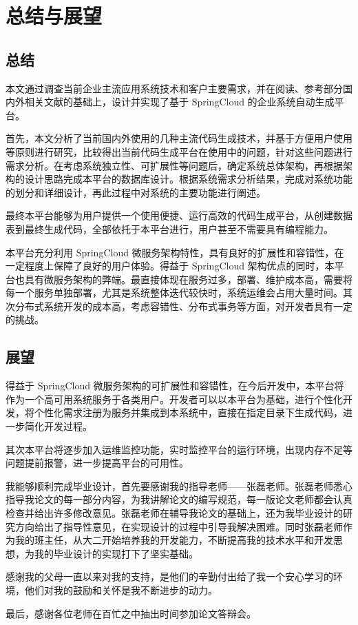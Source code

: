 \documentclass{izdthesis}
\begin{document}
\chapter{总结与展望}

\section{总结}
本文通过调查当前企业主流应用系统技术和客户主要需求，并在阅读、参考部分国内外相关文献的基础上，设计并实现了基于 SpringCloud 的企业系统自动生成平台。

首先，本文分析了当前国内外使用的几种主流代码生成技术，并基于方便用户使用等原则进行研究，比较得出当前代码生成平台在使用中的问题，针对这些问题进行需求分析。在考虑系统独立性、可扩展性等问题后，确定系统总体架构，再根据架构的设计思路完成本平台的数据库设计。根据系统需求分析结果，完成对系统功能的划分和详细设计，再此过程中对系统的主要功能进行阐述。

最终本平台能够为用户提供一个使用便捷、运行高效的代码生成平台，从创建数据表到最终生成代码，全部依托于本平台进行，用户甚至不需要具有编程能力。

本平台充分利用 SpringCloud 微服务架构特性，具有良好的扩展性和容错性，在一定程度上保障了良好的用户体验。得益于 SpringCloud 架构优点的同时，本平台也具有微服务架构的弊端。最直接体现在服务过多，部署、维护成本高，需要将每一个服务单独部署，尤其是系统整体迭代较快时，系统运维会占用大量时间。其次分布式系统开发的成本高，考虑容错性、分布式事务等方面，对开发者具有一定的挑战。

\section{展望}
得益于 SpringCloud 微服务架构的可扩展性和容错性，在今后开发中，本平台将作为一个高可用系统服务于各类用户。开发者可以以本平台为基础，进行个性化开发，将个性化需求注册为服务并集成到本系统中，直接在指定目录下生成代码，进一步简化开发过程。

其次本平台将逐步加入运维监控功能，实时监控平台的运行环境，出现内存不足等问题提前报警，进一步提高平台的可用性。


\begin{acknowledgements}
我能够顺利完成毕业设计，首先要感谢我的指导老师——张磊老师。张磊老师悉心指导我论文的每一部分内容，为我讲解论文的编写规范，每一版论文老师都会认真检查并给出许多修改意见。张磊老师在辅导我论文的基础上，还为我毕业设计的研究方向给出了指导性意见，在实现设计的过程中引导我解决困难。同时张磊老师作为我的班主任，从大二开始培养我的开发能力，不断提高我的技术水平和开发思想，为我的毕业设计的实现打下了坚实基础。

感谢我的父母一直以来对我的支持，是他们的辛勤付出给了我一个安心学习的环境，他们对我的鼓励和关怀是我不断进步的动力。

最后，感谢各位老师在百忙之中抽出时间参加论文答辩会。
\end{acknowledgements}
\end{document}
